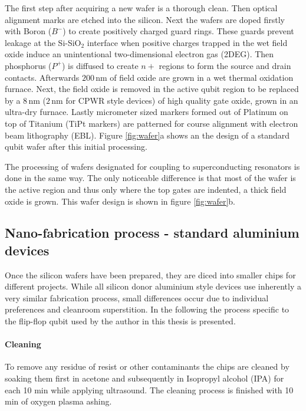 The first step after acquiring a new wafer is a thorough clean. Then optical alignment marks are etched into the silicon. Next the wafers are doped firstly with Boron ($B^-$) to create positively charged guard rings. These guards prevent leakage at the Si-SiO$_2$ interface when positive charges trapped in the wet field oxide induce an unintentional two-dimensional electron gas (2DEG). Then phosphorus ($P^+$) is diffused to create $n+$ regions to form the source and drain contacts. Afterwards $200\,$nm of field oxide are grown in a wet thermal oxidation furnace. Next, the field oxide is removed in the active qubit region to be replaced by a $8\,$nm ($2\,$nm for CPWR style devices) of high quality gate oxide, grown in an ultra-dry furnace. Lastly micrometer sized markers formed out of Platinum on top of Titanium (TiPt markers) are patterned for course alignment with electron beam lithography (EBL). Figure \ref{fig:wafer}a shows an the design of a standard qubit wafer after this initial processing. 

The processing of wafers designated for coupling to superconducting resonators is done in the same way. The only noticeable difference is that most of the wafer is the active region and thus only where the top gates are indented, a thick field oxide is grown. This wafer design is shown in figure \ref{fig:wafer}b. 


\subsection{Nano-fabrication process - standard aluminium devices} \label{sec:nanofab_al}

Once the silicon wafers have been prepared, they are diced into smaller chips for different projects. While all silicon donor aluminium style devices use inherently a very similar fabrication process, small differences occur due to individual preferences and cleanroom superstition. In the following the process specific to the flip-flop qubit used by the author in this thesis is presented. 

\paragraph*{Cleaning}
To remove any residue of resist or other contaminants the chips are cleaned by soaking them first in acetone and subsequently in Isopropyl alcohol (IPA) for each 10 min while applying ultrasound. The cleaning process is finished with 10 min of oxygen plasma ashing. 

